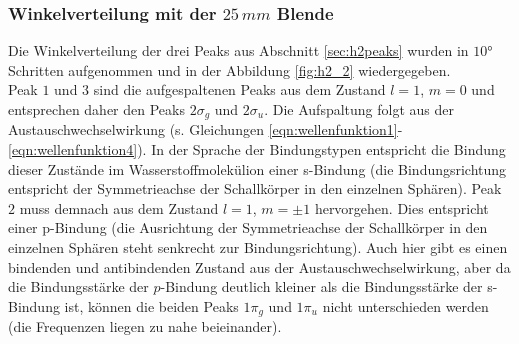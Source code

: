 \subsubsection{Winkelverteilung mit der $25 \, mm$ Blende}
Die Winkelverteilung der drei Peaks aus Abschnitt \ref{sec:h2peaks} wurden in $10°$ Schritten aufgenommen und in der Abbildung \ref{fig:h2_2} wiedergegeben. \\
Peak $1$ und $3$ sind die aufgespaltenen Peaks aus dem Zustand $l=1$, $m=0$ und entsprechen daher den Peaks $2\sigma_g$ und $2\sigma_u$. Die Aufspaltung folgt aus der Austauschwechselwirkung (s. Gleichungen \ref{eqn:wellenfunktion1}-\ref{eqn:wellenfunktion4}). In der Sprache der Bindungstypen entspricht die Bindung dieser Zustände im Wasserstoffmolekülion einer s-Bindung (die Bindungsrichtung entspricht der Symmetrieachse der Schallkörper in den einzelnen Sphären).
Peak $2$ muss demnach aus dem Zustand $l=1$, $m=\pm 1$ hervorgehen. Dies entspricht einer p-Bindung (die Ausrichtung der Symmetrieachse der Schallkörper in den einzelnen Sphären steht senkrecht zur Bindungsrichtung). Auch hier gibt es einen bindenden und antibindenden Zustand aus der Austauschwechselwirkung, aber da die Bindungsstärke der $p$-Bindung deutlich kleiner als die Bindungsstärke der s-Bindung ist, können die beiden Peaks $1\pi_g$ und $1\pi_u$ nicht unterschieden werden (die Frequenzen liegen zu nahe beieinander). 

